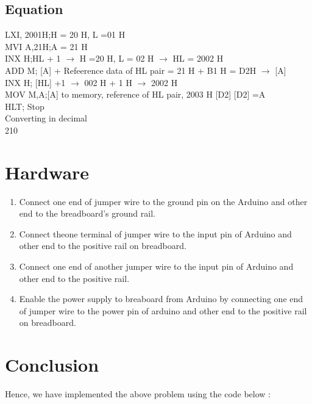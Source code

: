 \documentclass[10pt,a4paper]{article}
\begin{document}
 \subsection{Equation}
	LXI, 2001H;H = 20 H, L =01 H \\
	MVI A,21H;A = 21 H \\
	INX H;HL + 1 $ \rightarrow $ H =20 H, L = 02 H $ \rightarrow $ HL = 2002 H \\
	ADD M; [A] + Refeerence data of HL pair = 21 H + B1 H = D2H $ \rightarrow $ [A] \\
	INX H;  [HL] +1 $ \rightarrow $ 002 H + 1 H $ \rightarrow $ 2002 H \\
	MOV M,A;[A] to  memory, reference of HL pair, 2003 H [D2]  [D2] =A \\
	HLT; Stop \\
	Converting in decimal \\
	210 \\
\section{Hardware}
\begin{enumerate}
	\item  Connect one end of jumper wire to the ground pin on the Arduino and other end to the breadboard's 
		ground rail.
	\item  Connect theone terminal of jumper wire to the input pin of Arduino and other end to the positive 
		rail on breadboard.
	\item Connect one end of another jumper wire to the input pin of Arduino and other end to the positive 
		rail.
	\item Enable the power supply to breaboard from Arduino by connecting one end of jumper wire to the 
		power pin of arduino and other end to the positive rail on breadboard.
\end{enumerate}
\section{Conclusion}
  Hence, we have implemented the above problem using the code below : \\
\end{document}
